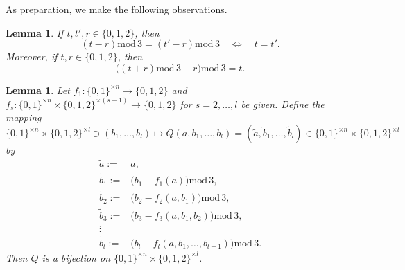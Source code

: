 \documentclass[a4paper,aps,floatfix]{revtex4}
\newtheorem{lemma}[theorem]{Lemma}
\begin{document}
As preparation, we make the following observations.
\begin{lemma} 
If $t,t',r\in\{0,1,2\}$, then 
\begin{equation}
\label{sfgfsgm}
(t-r)\mathrm{mod}\, 3 = (t'-r)\mathrm{mod}\, 3\quad\Leftrightarrow\quad t = t'.
\end{equation}
Moreover, if $t,r\in\{0,1,2\}$, then
\begin{equation}
\label{sbdfbsf}
\big((t+r)\mathrm{mod}\,3 - r\big)\mathrm{mod}\, 3 = t.
\end{equation}
\end{lemma}


\begin{lemma}
\label{xfgrqreqghr}
Let $f_1:\{0,1\}^{\times n}\rightarrow \{0,1,2\}$ and 
 $f_s:\{0,1\}^{\times n}\times \{0,1,2\}^{\times (s-1)}\rightarrow \{0,1,2\}$ for $s = 2,\ldots, l$ be given. 
Define the  mapping $\{0,1\}^{\times n}\times \{0,1,2\}^{\times l}\ni (b_1,\ldots, b_l) \mapsto Q(a,b_1,\ldots, b_l) = (\tilde{a},\tilde{b}_1,\ldots, \tilde{b}_l)\in \{0,1\}^{\times n}\times\{0,1,2\}^{\times l}$ by
\begin{equation}
\label{sdvabaef}
\begin{split}
\tilde{a} := & a,\\
\tilde{b}_1 := &  \big(b_1-f_1(a)\big)\mathrm{mod}\, 3,\\
\tilde{b}_2 := & \big(b_2-f_2(a,b_1)\big)\mathrm{mod}\, 3,\\
\tilde{b}_3 := & \big( b_3-f_3(a,b_1,b_2)\big)\mathrm{mod}\, 3,\\
\vdots & \\
\tilde{b}_l := & \big( b_l-f_l(a,b_1,\ldots,b_{l-1})\big)\mathrm{mod}\, 3.
\end{split}
\end{equation}
Then $Q$ is a  bijection on $\{0,1\}^{\times n}\times\{0,1,2\}^{\times l}$.
\end{lemma}
\end{document}
